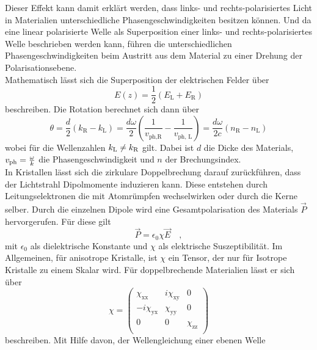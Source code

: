 \noindent
Dieser Effekt kann damit erklärt werden, dass links- und rechts-polarisiertes Licht in Materialien unterschiedliche Phasengeschwindigkeiten besitzen können.
Und da eine linear polarisierte Welle als Superposition einer links- und rechts-polarisiertes Welle beschrieben werden kann, führen die unterschiedlichen Phasengeschwindigkeiten beim Austritt aus dem Material zu 
einer Drehung der Polarisationsebene.\\
Mathematisch lässt sich die Superposition der elektrischen Felder über 
\begin{equation*}
    E\left(z\right) = \frac{1}{2}\left(E_\text{L}+E_\text{R}\right)
\end{equation*}
beschreiben. 
Die Rotation berechnet sich dann über
\begin{equation}
    \theta = \frac{d}{2}\left(k_\text{R}-k_\text{L}\right) = \frac{d\omega}{2}\left(\frac{1}{v_\text{ph,R}}-\frac{1}{v_\text{ph, L}}\right) = \frac{d\omega}{2c}\left(n_\text{R}-n_\text{L}\right)
    \label{eqn:theta}
\end{equation} 
wobei für die Wellenzahlen $k_{\text{L}} \neq k_{\text{R}}$ gilt. 
Dabei ist $d$ die Dicke des Materials, $v_{\text{ph}} = \frac{\omega}{k}$ die Phasengeschwindigkeit und $n$ der Brechungsindex.\\
In Kristallen lässt sich die zirkulare Doppelbrechung darauf zurückführen, dass der Lichtstrahl Dipolmomente induzieren kann.
Diese entstehen durch Leitungselektronen die mit Atomrümpfen wechselwirken oder durch die Kerne selber.
Durch die einzelnen Dipole wird eine Gesamtpolarisation des Materials $\vec{P}$ hervorgerufen.
Für diese gilt
\begin{equation*}
    \vec{P} = \epsilon_0 \chi \vec{E} \quad,
\end{equation*}
mit $\epsilon_0$ als dielektrische Konstante und $\chi$ als elektrische Suszeptibilität. 
Im Allgemeinen, für anisotrope Kristalle, ist $\chi$ ein Tensor, der nur für Isotrope Kristalle zu einem Skalar wird.
Für doppelbrechende Materialien lässt er sich über
\begin{equation}
    \chi = \left( \begin{array}{rrr}\chi_\text{xx} & i\chi_\text{xy} & 0 \\-i\chi_\text{yx} & \chi_\text{yy} & 0\\0 & 0 & \chi_\text{zz}\\\end{array}\right)
    \label{eqn:chi}
\end{equation}
beschreiben. Mit Hilfe davon, der Wellengleichung einer ebenen Welle 
